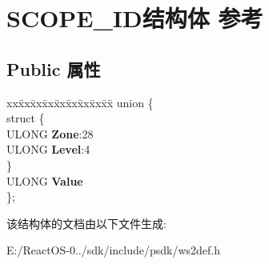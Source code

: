 \hypertarget{struct_s_c_o_p_e___i_d}{}\section{S\+C\+O\+P\+E\+\_\+\+I\+D结构体 参考}
\label{struct_s_c_o_p_e___i_d}
\subsection*{Public 属性}
\begin{DoxyCompactItemize}
\item 
\mbox{\label{struct_s_c_o_p_e___i_d_abcba69d52e789e2e3bbe77482f1372f4}} 
\begin{tabbing}
xx\=xx\=xx\=xx\=xx\=xx\=xx\=xx\=xx\=\kill
union \{\\
\mbox{\label{union_s_c_o_p_e___i_d_1_1_0D2906_adf37ef2df4caca5eb94cf395db62a008}} 
\>struct \{\\
\>\>ULONG {\bfseries Zone}:28\\
\>\>ULONG {\bfseries Level}:4\\
\>\} \\
\>ULONG {\bfseries Value}\\
\}; \\

\end{tabbing}\end{DoxyCompactItemize}


该结构体的文档由以下文件生成\+:\begin{DoxyCompactItemize}
\item 
E\+:/\+React\+O\+S-\/0../sdk/include/psdk/ws2def.\+h\end{DoxyCompactItemize}
